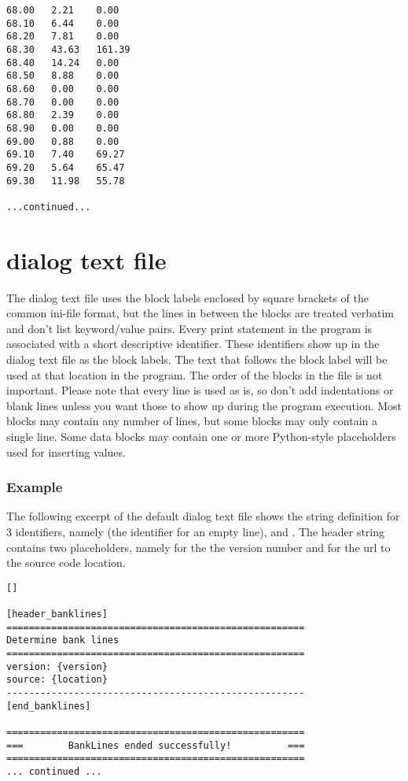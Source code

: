 \begin{Verbatim}
68.00   2.21    0.00
68.10   6.44    0.00
68.20   7.81    0.00
68.30   43.63   161.39
68.40   14.24   0.00
68.50   8.88    0.00
68.60   0.00    0.00
68.70   0.00    0.00
68.80   2.39    0.00
68.90   0.00    0.00
69.00   0.88    0.00
69.10   7.40    69.27
69.20   5.64    65.47
69.30   11.98   55.78

...continued...
\end{Verbatim}

\section{dialog text file}

The dialog text file uses the block labels enclosed by square brackets of the common ini-file format, but the lines in between the blocks are treated verbatim and don't list keyword/value pairs.
Every print statement in the program is associated with a short descriptive identifier.
These identifiers show up in the dialog text file as the block labels.
The text that follows the block label will be used at that location in the program.
The order of the blocks in the file is not important.
Please note that every line is used as is, so don't add indentations or blank lines unless you want those to show up during the program execution.
Most blocks may contain any number of lines, but some blocks may only contain a single line.
Some data blocks may contain one or more Python-style placeholders used for inserting values.

\subsubsection*{Example}

The following excerpt of the default  dialog text file shows the string definition for 3 identifiers, namely  (the identifier for an empty line),  and .
The header string contains two placeholders, namely  for the the version number and  for the url to the source code location.

\begin{Verbatim}
[]

[header_banklines]
=====================================================
Determine bank lines
=====================================================
version: {version}
source: {location}
-----------------------------------------------------
[end_banklines]

=====================================================
===        BankLines ended successfully!          ===
=====================================================
... continued ...
\end{Verbatim}